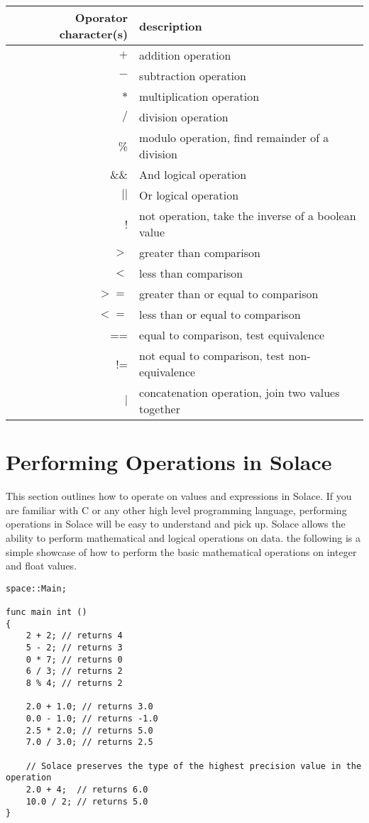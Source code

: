 \documentclass{article}
\begin{document}
\begin{center}
\begin{tabular}{|r|l|}
\hline
Oporator character(s) & description \\
\hline
\hline
$+$ & addition operation \\
$-$ & subtraction operation \\
$*$ & multiplication operation \\
$/$ & division operation \\
\% & modulo operation, find remainder of a division \\
\hline
\hline
\&\& & And logical operation \\
$||$ & Or logical operation \\
! & not operation, take the inverse of a boolean value \\
\hline
$>$ & greater than comparison \\
$<$ & less than comparison \\
$>=$ & greater than or equal to comparison \\
$<=$ & less than or equal to comparison \\
== & equal to comparison, test equivalence \\
!= & not equal to comparison, test non-equivalence \\
\hline
\hline
$|$ & concatenation operation, join two values together \\
\hline
\end{tabular}
\end{center}


\section{Performing Operations in Solace}

This section outlines how to operate on values and expressions in Solace. If you are familiar with C or any other high level programming language, performing 
operations in Solace will be easy to understand and pick up. Solace allows the ability to perform mathematical and logical operations on data. the following is a
simple showcase of how to perform the basic mathematical operations on integer and float values.

\begin{lstlisting}
space::Main;

func main int ()
{
	2 + 2; // returns 4
	5 - 2; // returns 3
	0 * 7; // returns 0
	6 / 3; // returns 2
	8 % 4; // returns 2

	2.0 + 1.0; // returns 3.0
	0.0 - 1.0; // returns -1.0
	2.5 * 2.0; // returns 5.0
	7.0 / 3.0; // returns 2.5

	// Solace preserves the type of the highest precision value in the operation
	2.0 + 4;  // returns 6.0
	10.0 / 2; // returns 5.0
}
\end{lstlisting}
\end{document}
